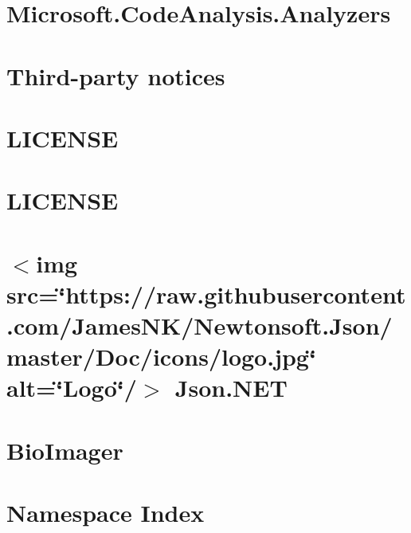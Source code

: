 \documentclass[twoside]{book}
\newcommand{\+}{\discretionary{\mbox{\scriptsize$\hookleftarrow$}}{}{}}
\begin{document}
\chapter{Microsoft.\+Code\+Analysis.\+Analyzers}
\label{md_packages__microsoft__code_analysis__analyzers_3_3_3_documentation__microsoft__code_analysis__analyzers}

\chapter{Third-\/party notices}
\label{md_packages__net_vips__native_win_x64_8_14_2__t_h_i_r_d__p_a_r_t_y__n_o_t_i_c_e_s}

\chapter{LICENSE}
\label{md_packages__newtonsoft__json_13_0_1__l_i_c_e_n_s_e}

\chapter{LICENSE}
\label{md_packages__newtonsoft__json_13_0_3__l_i_c_e_n_s_e}

\chapter{\texorpdfstring{$<$}{<}img src=\char`\"{}https\+://raw.\+githubusercontent.\+com/\+James\+NK/\+Newtonsoft.\+Json/master/\+Doc/icons/logo.\+jpg\char`\"{} alt=\char`\"{}\+Logo\char`\"{}/\texorpdfstring{$>$}{>} Json.\+NET}
\label{md_packages__newtonsoft__json_13_0_3__r_e_a_d_m_e}

\chapter{Bio\+Imager}
\label{md__r_e_a_d_m_e}

\chapter{Namespace Index}

\end{document}
